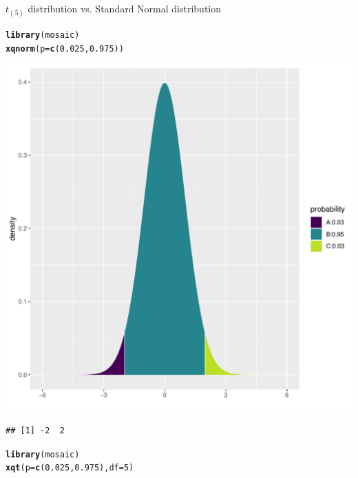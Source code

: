 \documentclass[10pt,handout]{beamer}\usepackage[]{graphicx}\usepackage[]{color}
\makeatletter
\def\maxwidth{ %
  \ifdim\Gin@nat@width>\linewidth
    \linewidth
  \else
    \Gin@nat@width
  \fi
}
\newcommand{\hlnum}[1]{\textcolor[rgb]{0.686,0.059,0.569}{#1}}%
\newcommand{\hlstd}[1]{\textcolor[rgb]{0.345,0.345,0.345}{#1}}%
\newcommand{\hlkwc}[1]{\textcolor[rgb]{0.333,0.667,0.333}{#1}}%
\newcommand{\hlkwd}[1]{\textcolor[rgb]{0.737,0.353,0.396}{\textbf{#1}}}%
\newenvironment{kframe}{%
 \def\at@end@of@kframe{}%
 \ifinner\ifhmode%
  \def\at@end@of@kframe{\end{minipage}}%
  \begin{minipage}{\columnwidth}%
 \fi\fi%
 \def\FrameCommand##1{\hskip\@totalleftmargin \hskip-\fboxsep
 \colorbox{shadecolor}{##1}\hskip-\fboxsep
     \hskip-\linewidth \hskip-\@totalleftmargin \hskip\columnwidth}%
 \MakeFramed {\advance\hsize-\width
   \@totalleftmargin\z@ \linewidth\hsize
   \@setminipage}}%
 {\par\unskip\endMakeFramed%
 \at@end@of@kframe}
\newenvironment{knitrout}{}{} %
\makeatother
\begin{document}
\begin{frame}[fragile]{$t_{(5)}$ distribution vs. Standard Normal distribution}
	\begin{minipage}{0.47\textwidth}
\begin{knitrout}\tiny
{}\color{fgcolor}\begin{kframe}
\begin{alltt}
\hlkwd{library}\hlstd{(mosaic)}
\hlkwd{xqnorm}\hlstd{(}\hlkwc{p} \hlstd{=} \hlkwd{c}\hlstd{(}\hlnum{0.025}\hlstd{,} \hlnum{0.975}\hlstd{))}
\end{alltt}
\end{kframe}
\end{knitrout}
\begin{knitrout}\tiny
{}\color{fgcolor}

{\centering \includegraphics[width=\maxwidth]{figure/unnamed-chunk-2-1} 

}


\begin{kframe}\begin{verbatim}
## [1] -2  2
\end{verbatim}
\end{kframe}
\end{knitrout}
	\end{minipage}
	\begin{minipage}{0.5\textwidth}
\begin{knitrout}\tiny
{}\color{fgcolor}\begin{kframe}
\begin{alltt}
\hlkwd{library}\hlstd{(mosaic)}
\hlkwd{xqt}\hlstd{(}\hlkwc{p} \hlstd{=} \hlkwd{c}\hlstd{(}\hlnum{0.025}\hlstd{,} \hlnum{0.975}\hlstd{),} \hlkwc{df} \hlstd{=} \hlnum{5}\hlstd{)}
\end{alltt}
\end{kframe}


\end{knitrout}
\end{minipage}
\end{frame}
\end{document}
